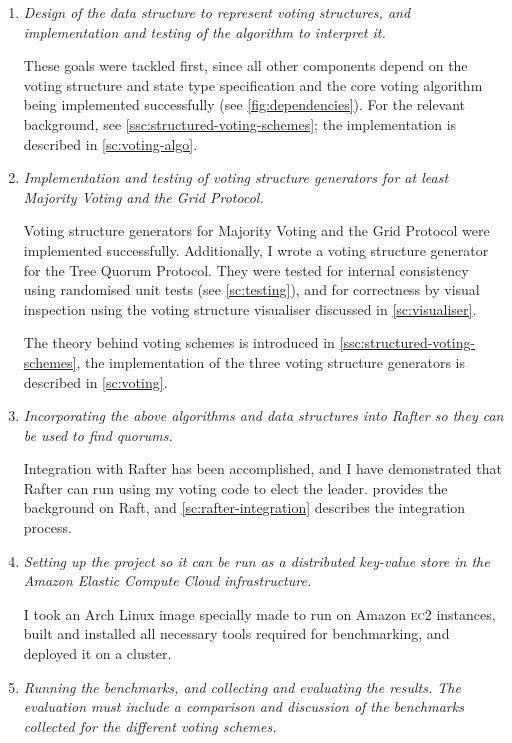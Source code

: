 \documentclass[12pt,chapterprefix=true,toc=bibliography,numbers=noendperiod,
               footnotes=multiple,twoside]{scrreprt}
\newcommand{\ECC}[0]{\textsc{ec}2}
\begin{document}
\begin{enumerate}
    \item \emph{Design of the data structure to represent voting structures, and implementation and testing of the algorithm to interpret it.}

        These goals were tackled first, since all other components depend on the voting structure and state type specification and the core voting algorithm being implemented successfully (see \cref{fig:dependencies}). For the relevant background, see \cref{ssc:structured-voting-schemes}; the implementation is described in \cref{sc:voting-algo}.
    \item \emph{Implementation and testing of voting structure generators for at least Majority Voting and the Grid Protocol.}

        Voting structure generators for Majority Voting and the Grid Protocol were implemented successfully. Additionally, I wrote a voting structure generator for the Tree Quorum Protocol. They were tested for internal consistency using randomised unit tests (see \cref{sc:testing}), and for correctness by visual inspection using the voting structure visualiser discussed in \cref{sc:visualiser}.

        The theory behind voting schemes is introduced in \cref{ssc:structured-voting-schemes}, the implementation of the three voting structure generators is described in \cref{sc:voting}.
    \item \emph{Incorporating the above algorithms and data structures into Rafter so they can be used to find quorums.}

        Integration with Rafter has been accomplished, and I have demonstrated that Rafter can run using my voting code to elect the leader.  provides the background on Raft, and \cref{sc:rafter-integration} describes the integration process.
    \item \emph{Setting up the project so it can be run as a distributed key-value store in the Amazon Elastic Compute Cloud infrastructure.}

I took an Arch Linux image specially made to run on Amazon \ECC{} instances, built and installed all necessary tools required for benchmarking, and deployed it on a cluster.
    \item \emph{Running the benchmarks, and collecting and evaluating the results. The evaluation must include a comparison and discussion of the benchmarks collected for the different voting schemes.}


\end{enumerate}
\end{document}
